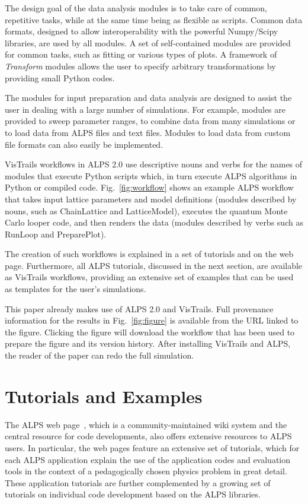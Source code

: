 \documentclass[12pt]{iopart}
\begin{document}
The design goal of the data analysis modules is to take care of common, repetitive tasks, while at the same time being as flexible as scripts.  Common data formats, designed to allow interoperability with the powerful Numpy/Scipy libraries, are used by all modules. A set of self-contained modules are provided for common tasks, such as fitting or various types of plots. A framework of {\it Transform} modules allows the user to specify arbitrary transformations by providing small Python codes.

The modules for input preparation and data analysis are designed to assist the user in dealing with a large number of simulations. For example, modules are provided to sweep parameter ranges, to combine data from many simulations or to load data from ALPS files and text files.  Modules to load data from custom file formats can also easily be implemented.

VisTrails workflows in ALPS 2.0 use descriptive nouns and verbs for the names of modules that execute
 Python scripts which, in turn execute ALPS
algorithms in Python or compiled code. Fig.~\ref{fig:workflow} shows an example ALPS workflow
that takes input lattice parameters and model definitions (modules described by nouns, such as 
 ChainLattice and LatticeModel), executes the quantum
Monte Carlo looper code, and then renders the data (modules described by verbs such as  RunLoop and PreparePlot).

The creation of such workflows is explained in a set of tutorials and on the web page. Furthermore, all ALPS tutorials, discussed in the next section, are available  as VisTrails workflows, providing an extensive set of examples that can be used as templates for the user's simulations. 

This paper already makes use of ALPS 2.0 and VisTrails. Full provenance information for the results in Fig.~\ref{fig:figure} is available from the URL linked to the figure. Clicking the figure will download the workflow that has been used to prepare the figure and its version history. After installing VisTrails and ALPS, the reader of the paper can redo the full simulation.


\section{Tutorials and Examples}

The ALPS web page~\cite{alps}, which is a community-maintained wiki system and the central resource for code developments,  
also offers extensive resources to ALPS users. In particular, the web pages feature an extensive set of tutorials, which for each ALPS application 
explain the use of the application codes and evaluation tools in the context of a pedagogically chosen physics problem in great detail.
These application tutorials are further complemented by a growing set of tutorials on individual code development based on the ALPS libraries.
\end{document}
